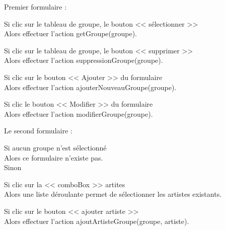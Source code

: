 			\begin{paragraphe}
				Premier formulaire :
			\end{paragraphe}

			\begin{paragraphe}
				Si clic sur le tableau de groupe, le bouton << sélectionner >> \\
				Alors effectuer l'action getGroupe(groupe).
			\end{paragraphe}

			\begin{paragraphe}
				Si clic sur le tableau de groupe, le bouton << supprimer >> \\
				Alors effectuer l'action suppressionGroupe(groupe).
			\end{paragraphe}

			\begin{paragraphe}
				Si clic sur le bouton << Ajouter >> du formulaire \\
				Alors effectuer l'action ajouterNouveauGroupe(groupe).
			\end{paragraphe}

			\begin{paragraphe}
				Si clic le bouton << Modifier >> du formulaire \\
				Alors effectuer l'action modifierGroupe(groupe).
			\end{paragraphe}

			\begin{paragraphe}
				Le second formulaire :
			\end{paragraphe}

			\begin{paragraphe}
				Si aucun groupe n'est sélectionné \\
				Alors ce formulaire n'existe pas. \\
				Sinon
			\end{paragraphe}

			\begin{paragraphe}
				Si clic sur la << comboBox >> artites \\
				Alors une liste déroulante permet de sélectionner les artistes existants.
			\end{paragraphe}

			\begin{paragraphe}
				Si clic sur le bouton << ajouter artiste >> \\
				Alors effectuer l'action ajoutArtisteGroupe(groupe, artiste).
			\end{paragraphe}

